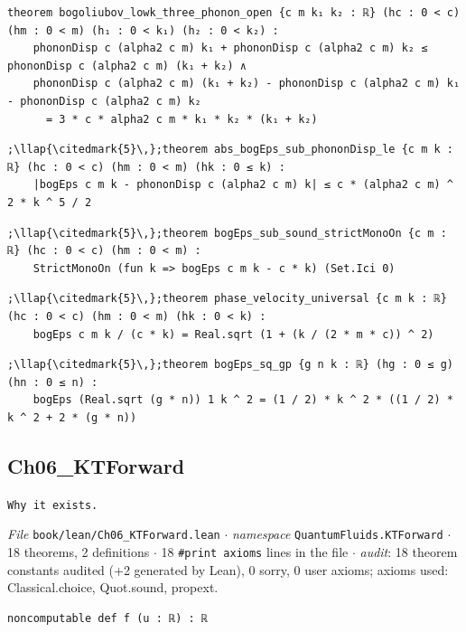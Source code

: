 \begin{lstlisting}[style=leancat]
theorem bogoliubov_lowk_three_phonon_open {c m k₁ k₂ : ℝ} (hc : 0 < c) (hm : 0 < m) (h₁ : 0 < k₁) (h₂ : 0 < k₂) :
    phononDisp c (alpha2 c m) k₁ + phononDisp c (alpha2 c m) k₂ ≤ phononDisp c (alpha2 c m) (k₁ + k₂) ∧
    phononDisp c (alpha2 c m) (k₁ + k₂) - phononDisp c (alpha2 c m) k₁ - phononDisp c (alpha2 c m) k₂
      = 3 * c * alpha2 c m * k₁ * k₂ * (k₁ + k₂)
\end{lstlisting}

\begin{lstlisting}[style=leancat]
;\llap{\citedmark{5}\,};theorem abs_bogEps_sub_phononDisp_le {c m k : ℝ} (hc : 0 < c) (hm : 0 < m) (hk : 0 ≤ k) :
    |bogEps c m k - phononDisp c (alpha2 c m) k| ≤ c * (alpha2 c m) ^ 2 * k ^ 5 / 2
\end{lstlisting}

\begin{lstlisting}[style=leancat]
;\llap{\citedmark{5}\,};theorem bogEps_sub_sound_strictMonoOn {c m : ℝ} (hc : 0 < c) (hm : 0 < m) :
    StrictMonoOn (fun k => bogEps c m k - c * k) (Set.Ici 0)
\end{lstlisting}

\begin{lstlisting}[style=leancat]
;\llap{\citedmark{5}\,};theorem phase_velocity_universal {c m k : ℝ} (hc : 0 < c) (hm : 0 < m) (hk : 0 < k) :
    bogEps c m k / (c * k) = Real.sqrt (1 + (k / (2 * m * c)) ^ 2)
\end{lstlisting}

\begin{lstlisting}[style=leancat]
;\llap{\citedmark{5}\,};theorem bogEps_sq_gp {g n k : ℝ} (hg : 0 ≤ g) (hn : 0 ≤ n) :
    bogEps (Real.sqrt (g * n)) 1 k ^ 2 = (1 / 2) * k ^ 2 * ((1 / 2) * k ^ 2 + 2 * (g * n))
\end{lstlisting}

\subsection{Ch06\_\allowbreak{}KTForward}
{\footnotesize\raggedright\texttt{Why it exists.\allowbreak{}}\par}
{\footnotesize\raggedright\emph{File} \texttt{book/lean/Ch06\_\allowbreak{}KTForward.\allowbreak{}lean} $\cdot$ \emph{namespace} \texttt{QuantumFluids.\allowbreak{}KTForward} $\cdot$ 18 theorems, 2 definitions $\cdot$ 18 \texttt{\#print axioms} lines in the file $\cdot$ \emph{audit}: 18 theorem constants audited (+2 generated by Lean), 0 sorry, 0 user axioms; axioms used: Classical.choice, Quot.sound, propext.\par}
\begin{lstlisting}[style=leancat]
noncomputable def f (u : ℝ) : ℝ
\end{lstlisting}

